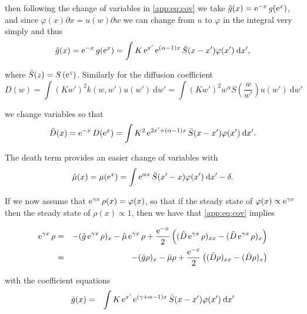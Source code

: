 \documentclass[../main.tex]{subfiles}
\begin{document}
  then following the change of variables in \autoref{app:eq:cov} we take $\hat{g}(x) = \operatorname{e}^{-x}g(\operatorname{e}^{x})$, and since $\varphi(x) \partial x = u(w) \partial w$ we can change from $u$ to $\varphi$ in the integral very simply and thus
  \begin{equation}
    \hat{g}(x) = \operatorname{e}^{-x} g(\operatorname{e}^{x}) = \int K \operatorname{e}^{x'} \operatorname{e}^{(\alpha -1) x} \bar{S}( x - x' ) \varphi(x') \: \mathrm{d} x',
  \end{equation}

  where $\bar{S}(z) = S \left(\operatorname{e}^{z} \right)$. Similarly for the diffusion coefficient
  \begin{equation}
    D(w) = \int (K w')^2 k(w, w') u(w') \: \mathrm{d} w' = \int (K w')^2 w^{\alpha} S \left( \frac{w}{w'} \right) u(w') \: \mathrm{d} w'
  \end{equation}

  we change variables so that
  \begin{equation}
    \hat{D}(x) = \operatorname{e}^{-x} D(\operatorname{e}^{x}) = \int K^2 \operatorname{e}^{2x' + (\alpha-1) x} \bar{S}(x - x') \varphi(x') \: \mathrm{d} x'.
  \end{equation}

  The death term provides an easier change of variables with
  \begin{equation}
    \hat{\mu}(x) = \mu(\operatorname{e}^{x}) = \int \operatorname{e}^{\alpha x} \bar{S}(x' - x) \varphi(x') \: \mathrm{d}x' - \delta.
  \end{equation}

  If we now assume that $\operatorname{e}^{\gamma x} \rho(x) = \varphi(x)$, so that if the steady state of $\varphi(x) \propto \operatorname{e}^{\gamma x}$ then the steady state of $\rho(x) \propto 1$, then we have that \autoref{app:eq:cov} implies

  \begin{eqnarray}
    \operatorname{e}^{\gamma x} \rho
    &=& - (\hat{g} \operatorname{e}^{\gamma x} \rho)_x - \hat{\mu} \operatorname{e}^{\gamma x} \rho + \frac{\operatorname{e}^{-x}}{2} \left( (\hat{D}\operatorname{e}^{\gamma x} \rho)_{xx} - (\hat{D} \operatorname{e}^{\gamma x} \rho)_x \right) \nonumber \\
    &=& - (\bar{g} \rho)_x - \bar{\mu} \rho + \frac{\operatorname{e}^{-x}}{2} \left( (\bar{D} \rho)_{xx} - (\bar{D} \rho)_x \right)
  \end{eqnarray}

  with the coefficient equations
  \begin{eqnarray}
    \bar{g}(x) &=& \int K \operatorname{e}^{x'} \operatorname{e}^{(\gamma + \alpha - 1) x} \bar{S}( x - x' ) \varphi(x') \: \mathrm{d} x' \\
  \end{eqnarray}
\end{document}
